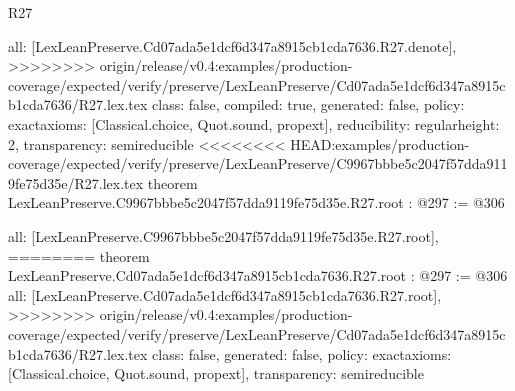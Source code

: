 \begin{lexlean}{R27}
\begin{coremodule}
{{{{{  all: [LexLeanPreserve.Cd07ada5e1dcf6d347a8915cb1cda7636.R27.denote],
>>>>>>>> origin/release/v0.4:examples/production-coverage/expected/verify/preserve/LexLeanPreserve/Cd07ada5e1dcf6d347a8915cb1cda7636/R27.lex.tex
  class: false,
  compiled: true,
  generated: false,
  policy: exact{axioms: [Classical.choice, Quot.sound, propext]},
  reducibility: regular{height: 2},
  transparency: semireducible
}
<<<<<<<< HEAD:examples/production-coverage/expected/verify/preserve/LexLeanPreserve/C9967bbbe5c2047f57dda9119fe75d35e/R27.lex.tex
theorem LexLeanPreserve.C9967bbbe5c2047f57dda9119fe75d35e.R27.root : @297 := @306 {
  all: [LexLeanPreserve.C9967bbbe5c2047f57dda9119fe75d35e.R27.root],
========
theorem LexLeanPreserve.Cd07ada5e1dcf6d347a8915cb1cda7636.R27.root : @297 := @306 {
  all: [LexLeanPreserve.Cd07ada5e1dcf6d347a8915cb1cda7636.R27.root],
>>>>>>>> origin/release/v0.4:examples/production-coverage/expected/verify/preserve/LexLeanPreserve/Cd07ada5e1dcf6d347a8915cb1cda7636/R27.lex.tex
  class: false,
  generated: false,
  policy: exact{axioms: [Classical.choice, Quot.sound, propext]},
  transparency: semireducible
}

}}}}}
\end{coremodule}
\end{lexlean}
